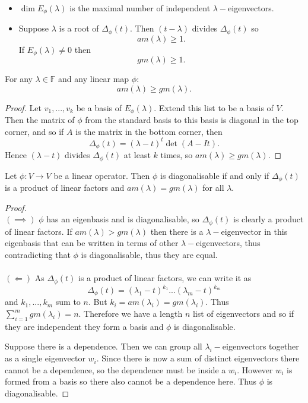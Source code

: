 \begin{remark} $ $
  \begin{itemize}
  \item $\dim E_\phi(\lambda)$ is the maximal number of independent $\lambda-$eigenvectors.
  \item Suppose $\lambda$ is a root of $\Delta_\phi(t)$. Then $(t - \lambda)$ divides $\Delta_\phi(t)$ so
    \[am(\lambda) \geq 1.\]
    If $E_\phi(\lambda) \not = 0$ then 
    \[gm(\lambda) \geq 1.\]
  \end{itemize}    
\end{remark}

\begin{prop}
  For any $\lambda \in \mathbb{F}$ and any linear map $\phi$:
    \[am(\lambda) \geq gm(\lambda).\]
\end{prop}
\begin{proof}
  Let $v_1,...,v_k$ be a basis of $E_\phi(\lambda)$. Extend this list to be a basis of $V$. Then the matrix of $\phi$ from the standard basis to this basis is diagonal in the top corner, and so if $A$ is the matrix in the bottom corner, then 
  \[\Delta_\phi(t) = (\lambda - t)^t \det(A -It).\]
  Hence $(\lambda - t)$ divides $\Delta_\phi(t)$ at least $k$ times, so $am(\lambda) \geq gm(\lambda)$.
\end{proof}

\begin{theorem}
    Let $\phi : V \rightarrow V$ be a linear operator. Then $\phi$ is diagonalisable if and only if $\Delta_\phi(t)$ is a product of linear factors and $am(\lambda) = gm(\lambda)$ for all $\lambda$.
    \end{theorem}
\begin{proof} $ $ \\
  $(\implies)$ $\phi$ has an eigenbasis and is diagonalisable, so $\Delta_\phi(t)$ is clearly a product of linear factors. If $am(\lambda) > gm(\lambda)$ then there is a $\lambda-$eigenvector in this eigenbasis that can be written in terms of other $\lambda-$eigenvectors, thus contradicting that $\phi$ is diagonalisable, thus they are equal.
    $ $ \\
  $ $ \\
  \noindent $(\Leftarrow)$ As $\Delta_\phi(t)$ is a product of linear factors, we can write it as
  \[\Delta_\phi(t) = (\lambda_1 - t)^{k_1} ... (\lambda_m - t)^{k_m}\]
  and $k_1, ..., k_m$ sum to $n$. But $k_i = am(\lambda_i) = gm(\lambda_i)$. Thus $\sum_{ i = 1}^{m} gm(\lambda_i) = n$. Therefore we have a length $n$ list of eigenvectors and so if they are independent they form a basis and $\phi$ is diagonalisable.

  Suppose there is a dependence. Then we can group all $\lambda_i-$eigenvectors together as a single eigenvector $w_i$. Since there is now a sum of distinct eigenvectors there cannot be a dependence, so the dependence must be inside a $w_i$. However $w_i$ is formed from a basis so there also cannot be a dependence here. Thus $\phi$ is diagonalisable.

\end{proof}
